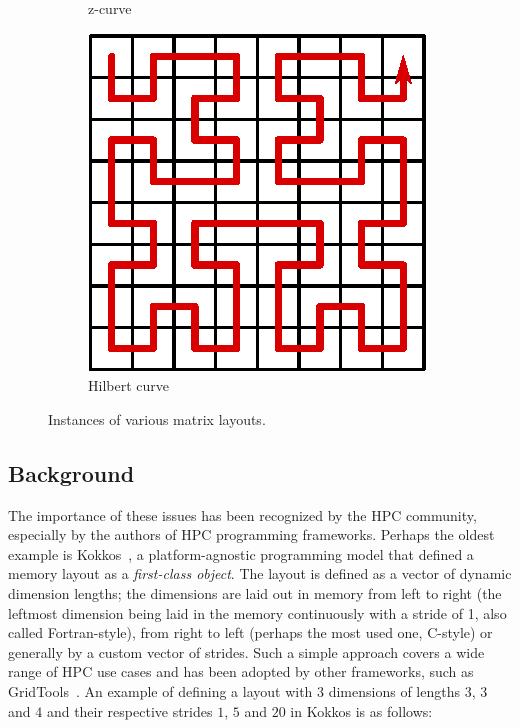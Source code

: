 \begin{figure}[h]
\begin{subfigure}{.15\textwidth}
      \caption{z-curve}
      \label{fig:layout-zcurve}
  \end{subfigure}
  \begin{subfigure}{.15\textwidth}
      \centering
      \includegraphics[width=.9\linewidth]{img/matrix-hcurve}
      \caption{Hilbert curve}
      \label{fig:layout-hcurve}
  \end{subfigure}
  \caption{Instances of various matrix layouts.}
  \label{fig:matrix-layout}
  \end{figure}

\subsection{Background}

The importance of these issues has been recognized by the HPC community, especially by the authors of HPC programming frameworks. Perhaps the oldest example is Kokkos~\cite{CARTEREDWARDS20143202}, a platform-agnostic programming model that defined a memory layout as a \emph{first-class object}. The layout is defined as a vector of dynamic dimension lengths; the dimensions are laid out in memory from left to right (the leftmost dimension being laid in the memory continuously with a stride of 1, also called Fortran-style), from right to left (perhaps the most used one, C-style) or generally by a custom vector of strides. Such a simple approach covers a wide range of HPC use cases and has been adopted by other frameworks, such as GridTools~\cite{AFANASYEV2021100707}. An example of defining a layout with $3$ dimensions of lengths $3$, $3$ and $4$ and their respective strides $1$, $5$ and $20$ in Kokkos is as follows:

